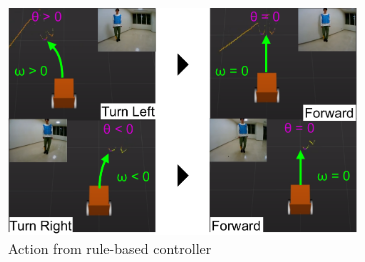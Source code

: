 
  \begin{figure}[h]
    \centering
    \includegraphics[height=6cm] {images/pdf/RobotGuidance_rule-based_controller}
    \captionsetup{justification=raggedright} %
    \caption{Action from rule-based controller}
    \label{Fig:Action from rule-based controller}
  \end{figure}

\newpage
